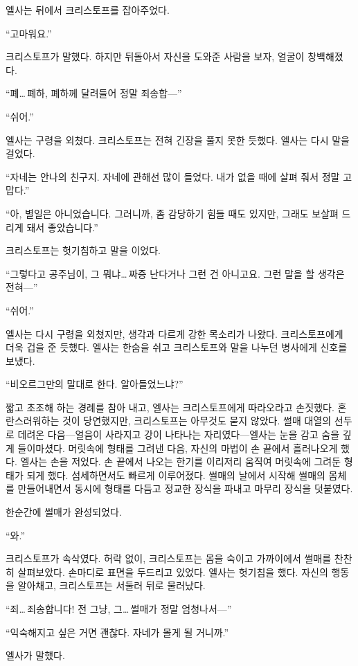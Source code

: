 엘사는 뒤에서 크리스토프를 잡아주었다.

``고마워요.''

크리스토프가 말했다. 하지만 뒤돌아서 자신을 도와준 사람을 보자, 얼굴이 창백해졌다.

``폐\ldots\,폐하, 폐하께 달려들어 정말 죄송합—''

``쉬어.''

엘사는 구령을 외쳤다. 크리스토프는 전혀 긴장을 풀지 못한 듯했다. 엘사는 다시 말을 걸었다.

``자네는 안나의 친구지. 자네에 관해선 많이 들었다. 내가 없을 때에 살펴 줘서 정말 고맙다.''

``아, 별일은 아니었습니다. 그러니까, 좀 감당하기 힘들 때도 있지만, 그래도 보살펴 드리게 돼서 좋았습니다.''

크리스토프는 헛기침하고 말을 이었다.

``그렇다고 공주님이, 그 뭐냐\ldots\,짜증 난다거나 그런 건 아니고요. 그런 말을 할 생각은 전혀—''

``쉬어.''

엘사는 다시 구령을 외쳤지만, 생각과 다르게 강한 목소리가 나왔다. 크리스토프에게 더욱 겁을 준 듯했다. 엘사는 한숨을 쉬고 크리스토프와 말을 나누던 병사에게 신호를 보냈다.

``비오르그만의 말대로 한다. 알아들었느냐?''

짧고 초조해 하는 경례를 참아 내고, 엘사는 크리스토프에게 따라오라고 손짓했다. 혼란스러워하는 것이 당연했지만, 크리스토프는 아무것도 묻지 않았다. 썰매 대열의 선두로 데려온 다음—얼음이 사라지고 강이 나타나는 자리였다—엘사는 눈을 감고 숨을 깊게 들이마셨다. 머릿속에 형태를 그려낸 다음, 자신의 마법이 손 끝에서 흘러나오게 했다. 엘사는 손을 저었다. 손 끝에서 나오는 한기를 이리저리 움직여 머릿속에 그려둔 형태가 되게 했다. 섬세하면서도 빠르게 이루어졌다. 썰매의 날에서 시작해 썰매의 몸체를 만들어내면서 동시에 형태를 다듬고 정교한 장식을 파내고 마무리 장식을 덧붙였다.

한순간에 썰매가 완성되었다.

``와.''

크리스토프가 속삭였다. 허락 없이, 크리스토프는 몸을 숙이고 가까이에서 썰매를 찬찬히 살펴보았다. 손마디로 표면을 두드리고 있었다. 엘사는 헛기침을 했다. 자신의 행동을 알아채고, 크리스토프는 서둘러 뒤로 물러났다.

``죄\ldots\,죄송합니다! 전 그냥, 그\ldots\,썰매가 정말 엄청나서—''

``익숙해지고 싶은 거면 괜찮다. 자네가 몰게 될 거니까.''

엘사가 말했다.

